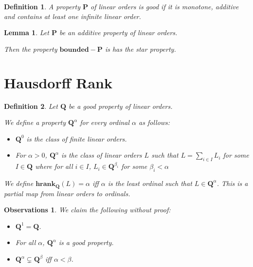 \documentclass{article}
\newtheorem{observations}{Observations}
\newtheorem{lemma}{Lemma}
\newtheorem{definition}{Definition}
\newcommand{\hrank}[1]{\mathbf{hrank}_{\qq}\left( #1 \right)}
\newcommand{\bounded}{\mathbf{bounded}}
\newcommand{\pp}{\mathbf{P}}
\newcommand{\qq}{\mathbf{Q}}
\begin{document}
\begin{definition}
  A property $\pp$ of linear orders is \emph{good} if it is 
  monotone, additive and contains at least one infinite linear order.
\end{definition}
  
\begin{lemma}
  Let $\pp$ be an additive property of linear orders.

  Then the property $\bounded-\pp$ is has the star property.
\end{lemma}

\section{Hausdorff Rank}

\begin{definition}
  Let $\qq$ be a good property of linear orders.

  We define a property $\qq^\alpha$ for every ordinal $\alpha$ as follows:
  
  \begin{itemize}
    \item $\qq^0$ is the class of finite linear orders.
    \item For $\alpha > 0$, $\qq^\alpha$ is the class of linear orders $L$ such that
          $L = \sum_{i \in I} L_i$ for some $I \in \qq$ where 
          for all $i \in I$, $L_i \in \qq^{\beta_i}$ for some $\beta_i < \alpha$
  \end{itemize}

  We define $\hrank{L} = \alpha$ iff $\alpha$ is the
  least ordinal such that $L \in \qq^\alpha$. This is a \emph{partial} map
  from linear orders to ordinals.
\end{definition}

\begin{observations}
  We claim the following without proof:

  \begin{itemize}
    \item $\qq^1 = \qq$.
    \item For all $\alpha$, $\qq^\alpha$ is a good property.
    \item $\qq^\alpha \subsetneq \qq^\beta$ iff $\alpha < \beta$.
  \end{itemize}
\end{observations}
\end{document}
